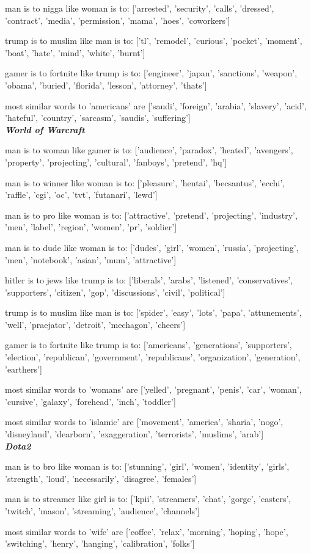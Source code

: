 man is to nigga like woman is to: ['arrested', 'security', 'calls', 'dressed', 'contract', 'media', 'permission', 'mama', 'hoes', 'coworkers']

trump is to muslim like man is to: ['tl', 'remodel', 'curious', 'pocket', 'moment', 'boat', 'hate', 'mind', 'white', 'burnt']

gamer is to fortnite like trump is to: ['engineer', 'japan', 'sanctions', 'weapon', 'obama', 'buried', 'florida', 'lesson', 'attorney', 'thats']

most similar words to 'americans' are ['saudi', 'foreign', 'arabia', 'slavery', 'acid', 'hateful', 'country', 'sarcasm', 'saudis', 'suffering']\\

\textbf{\emph{World of Warcraft}}

man is to woman like gamer is to: ['audience', 'paradox', 'heated', 'avengers', 'property', 'projecting', 'cultural', 'fanboys', 'pretend', 'hq']

man is to winner like woman is to: ['pleasure', 'hentai', 'becsantus', 'ecchi', 'raffle', 'cgi', 'oc', 'tvt', 'futanari', 'lewd']

man is to pro like woman is to: ['attractive', 'pretend', 'projecting', 'industry', 'men', 'label', 'region', 'women', 'pr', 'soldier']

man is to dude like woman is to: ['dudes', 'girl', 'women', 'russia', 'projecting', 'men', 'notebook', 'asian', 'mum', 'attractive']

hitler is to jews like trump is to: ['liberals', 'arabs', 'listened', 'conservatives', 'supporters', 'citizen', 'gop', 'discussions', 'civil', 'political']

trump is to muslim like man is to: ['spider', 'easy', 'lots', 'papa', 'attunements', 'well', 'praejator', 'detroit', 'mechagon', 'cheers']

gamer is to fortnite like trump is to: ['americans', 'generations', 'supporters', 'election', 'republican', 'government', 'republicans', 'organization', 'generation', 'earthers']

most similar words to 'womans' are ['yelled', 'pregnant', 'penis', 'car', 'woman', 'cursive', 'galaxy', 'forehead', 'inch', 'toddler']

most similar words to 'islamic' are ['movement', 'america', 'sharia', 'nogo', 'disneyland', 'dearborn', 'exaggeration', 'terrorists', 'muslims', 'arab']\\

\textbf{\emph{Dota2}}

man is to bro like woman is to: ['stunning', 'girl', 'women', 'identity', 'girls', 'strength', 'loud', 'necessarily', 'disagree', 'females']

man is to streamer like girl is to: ['kpii', 'streamers', 'chat', 'gorgc', 'casters', 'twitch', 'mason', 'streaming', 'audience', 'channels']

most similar words to 'wife' are ['coffee', 'relax', 'morning', 'hoping', 'hope', 'switching', 'henry', 'hanging', 'calibration', 'folks']



